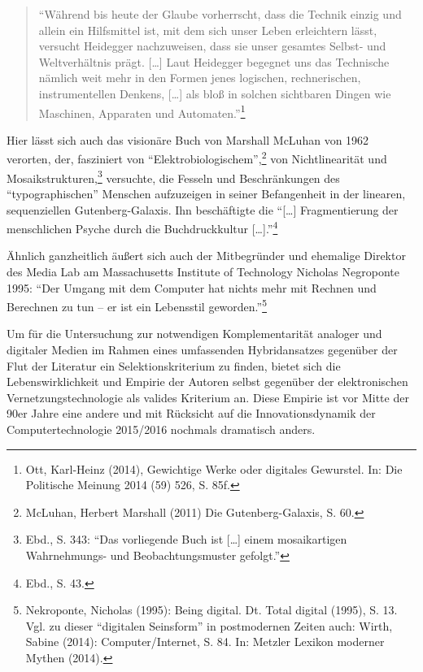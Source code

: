 \documentclass[a4paper,
fontsize=11pt,
oneside,
numbers=noperiodatend,
parskip=half-,
bibliography=totoc,
final
]{scrartcl}
\begin{document}
\begin{quote}
\enquote{Während bis heute der Glaube vorherrscht, dass die Technik
einzig und allein ein Hilfsmittel ist, mit dem sich unser Leben
erleichtern lässt, versucht Heidegger nachzuweisen, dass sie unser
gesamtes Selbst- und Weltverhältnis prägt. {[}\ldots{}{]} Laut Heidegger
begegnet uns das Technische nämlich weit mehr in den Formen jenes
logischen, rechnerischen, instrumentellen Denkens, {[}\ldots{}{]} als
bloß in solchen sichtbaren Dingen wie Maschinen, Apparaten und
Automaten.}\footnote{Ott, Karl-Heinz (2014), Gewichtige Werke oder
  digitales Gewurstel. In: Die Politische Meinung 2014 (59) 526, S. 85f.}
\end{quote}

Hier lässt sich auch das visionäre Buch von Marshall McLuhan von 1962
verorten, der, fasziniert von \enquote{Elektrobiologischem},\footnote{McLuhan,
  Herbert Marshall (2011) Die Gutenberg-Galaxis, S. 60.} von
Nichtlinearität und Mosaikstrukturen,\footnote{Ebd., S. 343:
  \enquote{Das vorliegende Buch ist {[}\ldots{}{]} einem mosaikartigen
  Wahrnehmungs- und Beobachtungsmuster gefolgt.}} versuchte, die Fesseln
und Beschränkungen des \enquote{typographischen} Menschen aufzuzeigen in
seiner Befangenheit in der linearen, sequenziellen Gutenberg-Galaxis.
Ihn beschäftigte die \enquote{{[}\ldots{}{]} Fragmentierung der
menschlichen Psyche durch die Buchdruckkultur {[}\ldots{}{]}.}\footnote{Ebd.,
  S. 43.}

Ähnlich ganzheitlich äußert sich auch der Mitbegründer und ehemalige
Direktor des Media Lab am Massachusetts Institute of Technology Nicholas
Negroponte 1995: \enquote{Der Umgang mit dem Computer hat nichts mehr
mit Rechnen und Berechnen zu tun -- er ist ein Lebensstil
geworden.}\footnote{Nekroponte, Nicholas (1995): Being digital. Dt.
  Total digital (1995), S. 13. Vgl. zu dieser \enquote{digitalen
  Seinsform} in postmodernen Zeiten auch: Wirth, Sabine (2014):
  Computer/Internet, S. 84. In: Metzler Lexikon moderner Mythen (2014).}

Um für die Untersuchung zur notwendigen Komplementarität analoger und
digitaler Medien im Rahmen eines umfassenden Hybridansatzes gegenüber
der Flut der Literatur ein Selektionskriterium zu finden, bietet sich
die Lebenswirklichkeit und Empirie der Autoren selbst gegenüber der
elektronischen Vernetzungstechnologie als valides Kriterium an. Diese
Empirie ist vor Mitte der 90er Jahre eine andere und mit Rücksicht auf
die Innovationsdynamik der Computertechnologie 2015/2016 nochmals
dramatisch anders.
\end{document}
